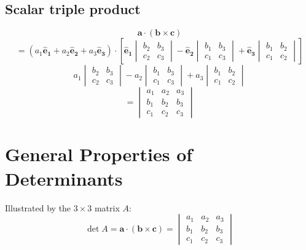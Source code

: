 \documentclass{article}
\renewcommand{\vec}[1]{\bm{#1}}
\newcommand{\vv}[1]{\vec{#1}}
\newcommand{\ve}[1]{\vec{\hat{e}_{#1}}}
\begin{document}
\subsection*{Scalar triple product}

\[\vv a\cdot(\vv b\times\vv c)\]
\[=(a_1\ve1+a_2\ve2+a_3\ve3)\cdot\left[\ve1
\begin{vmatrix}
b_2 & b_3\\
c_2 & c_3
\end{vmatrix}
-\ve2
\begin{vmatrix}
b_1 & b_3\\
c_1 & c_3
\end{vmatrix}
+\ve3
\begin{vmatrix}
b_1 & b_2\\
c_1 & c_2
\end{vmatrix}
\right]\]
\[a_1
\begin{vmatrix}
b_2 & b_3\\
c_2 & c_3
\end{vmatrix}
-a_2
\begin{vmatrix}
b_1 & b_3\\
c_1 & c_3
\end{vmatrix}
+a_3
\begin{vmatrix}
b_1 & b_2\\
c_1 & c_2
\end{vmatrix}\]
\[=
\begin{vmatrix}
a_1 & a_2 & a_3\\
b_1 & b_2 & b_3\\
c_1 & c_2 & c_3
\end{vmatrix}
\]

\section{General Properties of Determinants}

Illustrated by the \(3\times3\) matrix \(A\):
\[\det A=\vv a\cdot(\vv b\times\vv c)=
   \begin{vmatrix}
      a_1 & a_2 & a_3\\
      b_1 & b_2 & b_3\\
      c_1 & c_2 & c_3
   \end{vmatrix}
\]
\end{document}
